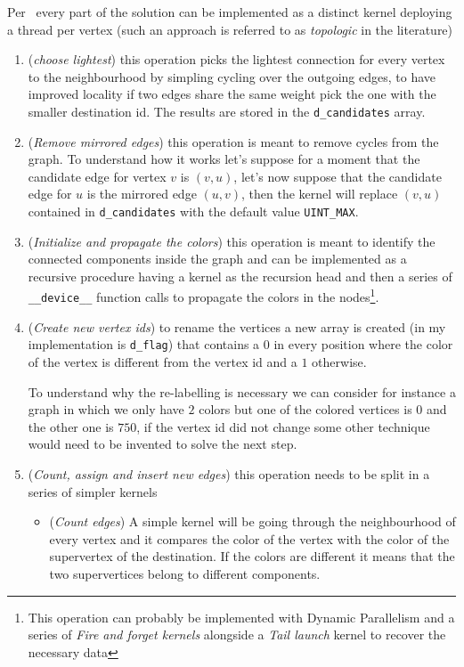 \documentclass[a4paper,10pt]{article}
\begin{document}
Per~\cite{generic-he-boruvka} every part of the solution can be implemented as a distinct kernel
deploying a thread per vertex (such an approach is referred to as \textit{topologic} in the
literature)
\begin{enumerate}
	\item\label{item:choose-lightest} (\textit{choose lightest}) this operation picks the
	lightest connection for every vertex to the neighbourhood by simpling cycling over
	the outgoing edges, to have improved locality if two edges share the same weight pick the one with the smaller destination id. The results are stored in the \texttt{d\_candidates} array.
	\item\label{item:mirror-removal} (\textit{Remove mirrored edges}) this operation is meant to
	remove cycles from the graph. To understand how it works let's suppose for a moment
	that the candidate edge for vertex $v$ is $(v, u)$, let's now suppose that the
	candidate edge for $u$ is the mirrored edge $(u, v)$, then the kernel will replace
	$(v, u)$ contained in \texttt{d\_candidates} with the default value
	\texttt{UINT\_MAX}.
	\item\label{item:coloration} (\textit{Initialize and propagate the colors}) this operation
	is meant to identify the connected components inside the graph and can be
	implemented as a recursive procedure having a kernel as the recursion head and then
	a series of \texttt{\_\_device\_\_} function calls to propagate the colors in the nodes\footnote{This operation can probably be implemented with Dynamic Parallelism and a series of \textit{Fire and forget kernels} alongside a \textit{Tail launch} kernel to recover the necessary data}.
	\item\label{item:vertex-rename} (\textit{Create new vertex ids}) to rename the vertices a
	new array is created (in my implementation is \texttt{d\_flag}) that contains a $0$
	in every position where the color of the vertex is different from the vertex id and
	a $1$ otherwise.

	To understand why the re-labelling is necessary we can consider for instance a graph
	in which we only have $2$ colors but one of the colored vertices is $0$ and the
	other one is $750$, if the vertex id did not change some other technique would need
	to be invented to solve the next step.
	\item\label{item:graph-contraction} (\textit{Count, assign and insert new edges}) this
	operation needs to be split in a series of simpler kernels
	\begin{itemize}
		\item\label{item:count-edges} (\textit{Count edges}) A simple kernel will be
		going through the neighbourhood of every vertex and it compares the
		color of the vertex with the color of the supervertex of the
		destination. If the colors are different it means that the two
		supervertices belong to different components.


\end{itemize}
\end{enumerate}
\end{document}
